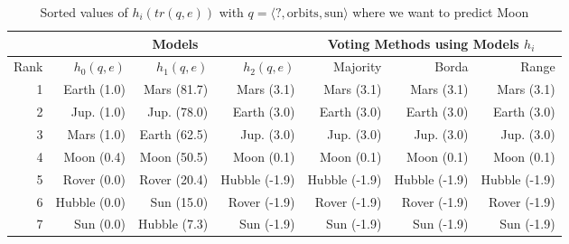 \begin{table} 
\centering 
\begin{tabular}{r|r|r|r|r|r|r}
&\multicolumn{3}{|c|}{Models}&
\multicolumn{3}{|c}{Voting Methods using Models $h_i$}\\
 \hline 
Rank &$h_0(q, e)$ &$h_1(q, e)$ &$h_2(q, e)$ &Majority &Borda &Range\\
\hline
1 &Earth (1.0)&		Mars (81.7)&		Mars (3.1)&		Mars (3.1) &Mars (3.1) &Mars (3.1)\\
2 &Jup. (1.0)&		Jup. (78.0)&		Earth (3.0)&		Earth (3.0) &Earth (3.0) &Earth (3.0)\\
3 &Mars (1.0)&		Earth (62.5)&		Jup. (3.0)&		Jup. (3.0) &Jup. (3.0) &Jup. (3.0)\\
4 &Moon (0.4)&		Moon (50.5)&		Moon (0.1)&		Moon (0.1) &Moon (0.1) &Moon (0.1)\\
\hline \hline
5 &Rover (0.0)&		Rover (20.4)&		Hubble (-1.9)&		Hubble (-1.9) &Hubble (-1.9) &Hubble (-1.9)\\
6 &Hubble (0.0)&		Sun (15.0)&		Rover (-1.9)&		Rover (-1.9) &Rover (-1.9) &Rover (-1.9)\\
7 &Sun (0.0)&		Hubble (7.3)&		Sun (-1.9)&		Sun (-1.9) &Sun (-1.9) &Sun (-1.9)\\
\end{tabular}
\caption{Sorted values of $h_i(tr(q,e))$ with $q=\langle ?, \text{orbits}, \text{sun} \rangle$ where we want to predict Moon}
\end{table}